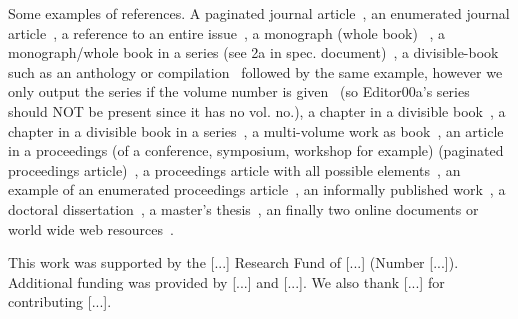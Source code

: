 \documentclass[sigconf, nonacm]{acmart}
\begin{document}
Some examples of references. A paginated journal article~\cite{Abril07}, an enumerated journal article~\cite{Cohen07}, a reference to an entire issue~\cite{JCohen96}, a monograph (whole book) ~\cite{Kosiur01}, a monograph/whole book in a series (see 2a in spec. document)~\cite{Harel79}, a divisible-book such as an anthology or compilation~\cite{Editor00} followed by the same example, however we only output the series if the volume number is given~\cite{Editor00a} (so Editor00a's series should NOT be present since it has no vol. no.), a chapter in a divisible book~\cite{Spector90}, a chapter in a divisible book in a series~\cite{Douglass98}, a multi-volume work as book~\cite{Knuth97}, an article in a proceedings (of a conference, symposium, workshop for example) (paginated proceedings article)~\cite{Andler79}, a proceedings article with all possible elements~\cite{Smith10}, an example of an enumerated proceedings article~\cite{VanGundy07}, an informally published work~\cite{Harel78}, a doctoral dissertation~\cite{Clarkson85}, a master's thesis~\cite{anisi03}, an finally two online documents or world wide web resources~\cite{Thornburg01, Ablamowicz07}.

\begin{acks}
 This work was supported by the [...] Research Fund of [...] (Number [...]). Additional funding was provided by [...] and [...]. We also thank [...] for contributing [...].
\end{acks}




\end{document}
